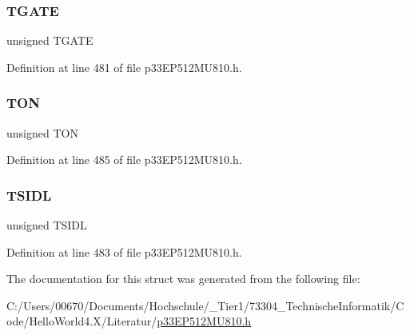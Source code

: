 \subsubsection{\texorpdfstring{T\+G\+A\+TE}{TGATE}}
{\footnotesize\ttfamily unsigned T\+G\+A\+TE}



Definition at line 481 of file p33\+E\+P512\+M\+U810.\+h.

\mbox{\label{structtag_t9_c_o_n_b_i_t_s_a8c2a094047d1019ce1c5b25ea8cff9b3}} 
\subsubsection{\texorpdfstring{T\+ON}{TON}}
{\footnotesize\ttfamily unsigned T\+ON}



Definition at line 485 of file p33\+E\+P512\+M\+U810.\+h.

\mbox{\label{structtag_t9_c_o_n_b_i_t_s_a4971b881615ef42703b5b78179fcda3d}} 
\subsubsection{\texorpdfstring{T\+S\+I\+DL}{TSIDL}}
{\footnotesize\ttfamily unsigned T\+S\+I\+DL}



Definition at line 483 of file p33\+E\+P512\+M\+U810.\+h.



The documentation for this struct was generated from the following file\+:\begin{DoxyCompactItemize}
\item 
C\+:/\+Users/00670/\+Documents/\+Hochschule/\+\_\+\+Tier1/73304\+\_\+\+Technische\+Informatik/\+Code/\+Hello\+World4.\+X/\+Literatur/\hyperlink{p33_e_p512_m_u810_8h}{p33\+E\+P512\+M\+U810.\+h}\end{DoxyCompactItemize}
